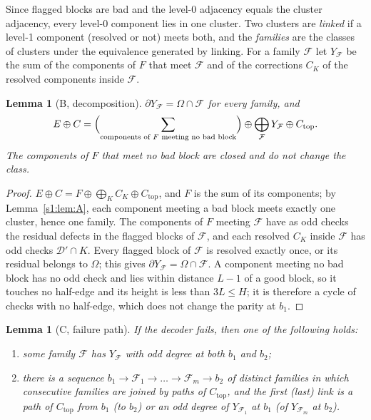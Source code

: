 \documentclass[11pt]{amsart}
\newtheorem{lemma}[theorem]{Lemma}
\theoremstyle{definition}
\theoremstyle{remark}
\numberwithin{equation}{section}
\newcommand{\cD}{\mathcal{D}}
\newcommand{\cF}{\mathcal{F}}
\newcommand{\Ctop}{C_{\mathrm{top}}}
\begin{document}
Since flagged blocks are bad and the level-0 adjacency equals the cluster adjacency, every level-0 component lies in one cluster. Two clusters are \emph{linked} if a level-1 component (resolved or not) meets both, and the \emph{families} are the classes of clusters under the equivalence generated by linking. For a family $\cF$ let $Y_\cF$ be the sum of the components of $F$ that meet $\cF$ and of the corrections $C_K$ of the resolved components inside $\cF$.

\begin{lemma}[B, decomposition]\label{s1:lem:B}
$\partial Y_\cF=\Omega\cap\cF$ for every family, and
\[
E\oplus C=\Bigl(\sum_{\text{components of $F$ meeting no bad block}}\Bigr)\oplus\bigoplus_\cF Y_\cF\oplus\Ctop .
\]
The components of $F$ that meet no bad block are closed and do not change the class.
\end{lemma}

\begin{proof}
$E\oplus C=F\oplus\bigoplus_KC_K\oplus\Ctop$, and $F$ is the sum of its components; by Lemma~\ref{s1:lem:A}, each component meeting a bad block meets exactly one cluster, hence one family. The components of $F$ meeting $\cF$ have as odd checks the residual defects in the flagged blocks of $\cF$, and each resolved $C_K$ inside $\cF$ has odd checks $\cD'\cap K$. Every flagged block of $\cF$ is resolved exactly once, or its residual belongs to $\Omega$; this gives $\partial Y_\cF=\Omega\cap\cF$. A component meeting no bad block has no odd check and lies within distance $L-1$ of a good block, so it touches no half-edge and its height is less than $3L\le H$; it is therefore a cycle of checks with no half-edge, which does not change the parity at $b_1$.
\end{proof}

\begin{lemma}[C, failure path]\label{s1:lem:C}
If the decoder fails, then one of the following holds:
\begin{enumerate}[label=(T\arabic*),leftmargin=2.5em]
\item some family $\cF$ has $Y_\cF$ with odd degree at both $b_1$ and $b_2$;
\item there is a sequence $b_1\to\cF_1\to\dots\to\cF_m\to b_2$ of distinct families in which consecutive families are joined by paths of $\Ctop$, and the first (last) link is a path of $\Ctop$ from $b_1$ (to $b_2$) or an odd degree of $Y_{\cF_1}$ at $b_1$ (of $Y_{\cF_m}$ at $b_2$).
\end{enumerate}
\end{lemma}
\end{document}

